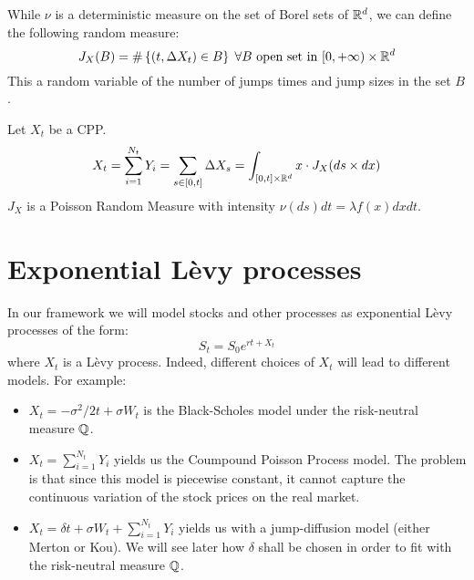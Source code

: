\begin{definition}
    While $\nu$ is a deterministic measure on the set of Borel sets of $\mathbb{R}^d$,
    we can define the following random measure:
    \[
        J_X(B) = \#\left\{ (t,\Delta X_t) \in B \right\} \; \forall B \text{
            open set in } [0,+\infty) \times \mathbb{R}^d 
    \]
    This a random variable of the number of jumps times and jump sizes in the 
    set $B$.
\end{definition}

\begin{application}
    Let $X_t$ be a CPP.
    \[ 
        X_t = \sum_{i=1}^{N_t} Y_i = \sum_{s\in[0,t]} \Delta X_s = \int_{[0,t]
        \times \mathbb{R}^d} x \cdot J_X(ds \times dx)
    \]
    $J_X$ is a Poisson Random Measure with intensity $\nu(ds)dt = \lambda f(x)
    dx dt$.
\end{application}

\section{Exponential Lèvy processes}
In our framework we will model stocks and other processes as exponential Lèvy
processes of the form:
\[
    S_t = S_0 e^{rt + X_t}
\]
where $X_t$ is a Lèvy process. Indeed, different choices of $X_t$ will lead to
different models. For example:
\begin{itemize}
    \item $X_t = -\sigma^2/2 t + \sigma W_t$ is the Black-Scholes model under
        the risk-neutral measure $\mathbb{Q}$.
    \item $X_t = \sum_{i=1}^{N_t} Y_i$ yields us the Coumpound Poisson Process
        model. The problem is that since this model is piecewise constant, it
        cannot capture the continuous variation of the stock prices on the real
        market.
    \item $X_t = \delta t + \sigma W_t + \sum_{i=1}^{N_t} Y_i$ yields us with a
        jump-diffusion model (either Merton or Kou). We will see later how 
        $\delta$ shall be chosen in order to fit with the risk-neutral measure
        $\mathbb{Q}$.
\end{itemize}

